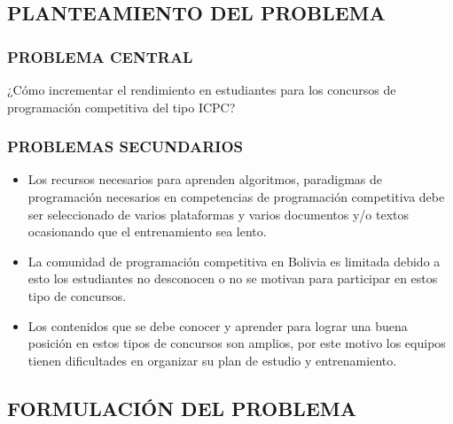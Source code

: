 \subsection{PLANTEAMIENTO DEL PROBLEMA}


\subsubsection{PROBLEMA CENTRAL}
¿Cómo incrementar el rendimiento en estudiantes para los concursos de programación competitiva del tipo ICPC? 

\subsubsection{PROBLEMAS SECUNDARIOS}
\begin{itemize}[nosep]
    \item[\textbullet] Los recursos necesarios para aprenden algoritmos, paradigmas de programación necesarios en competencias de programación competitiva debe ser seleccionado de varios plataformas y varios documentos y/o textos ocasionando que el entrenamiento sea lento.
    \item[\textbullet] La comunidad de programación competitiva en Bolivia es limitada debido a esto los estudiantes no desconocen o no se motivan para participar en estos tipo de concursos.
    \item[\textbullet] Los contenidos que se debe conocer y aprender para lograr una buena posición en estos tipos de concursos son amplios, por este motivo los equipos tienen dificultades en organizar su plan de estudio y entrenamiento.
\end{itemize}

\subsection{FORMULACIÓN DEL PROBLEMA}